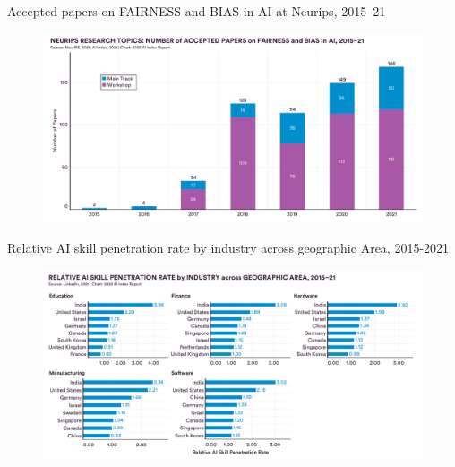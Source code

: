 {

\begin{frame}{
Accepted papers on FAIRNESS and BIAS in AI at Neurips, 2015–21
}

\begin{figure}
 \centering
 \includegraphics[width=1.0\textwidth]{./figures/progress-of-air-d/outputs/drawing-v00.png}
\end{figure}

\end{frame}
}


{

\begin{frame}{
Relative AI skill penetration rate by industry across geographic Area, 2015-2021
}

\begin{figure}
 \centering
 \includegraphics[width=1.0\textwidth]{./figures/progress-of-air-e/outputs/drawing-v00.png}
\end{figure}

\end{frame}
}



